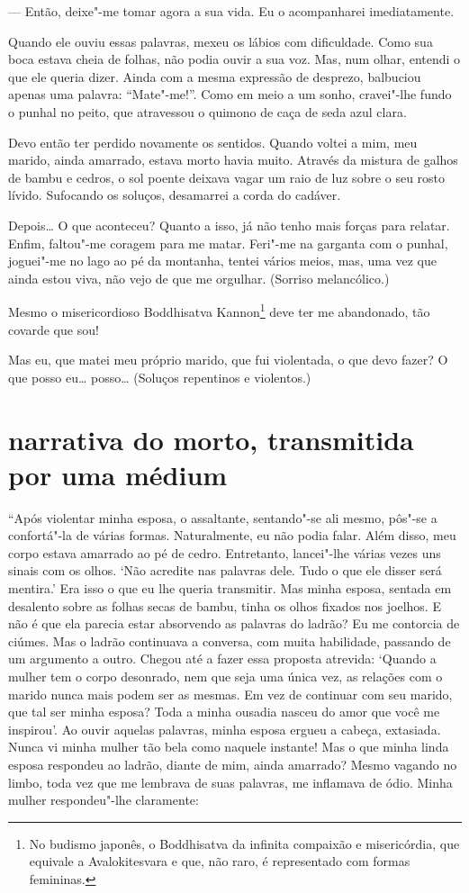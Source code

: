 --- Então, deixe"-me tomar agora a sua vida. Eu o acompanharei
imediatamente.

Quando ele ouviu essas palavras, mexeu os lábios com dificuldade. Como
sua boca estava cheia de folhas, não podia ouvir a sua voz. Mas, num
olhar, entendi o que ele queria dizer. Ainda com a mesma expressão de
desprezo, balbuciou apenas uma palavra: ``Mate"-me!''. Como em meio a um
sonho, cravei"-lhe fundo o punhal no peito, que atravessou o quimono de
caça de seda azul clara.

Devo então ter perdido novamente os sentidos. Quando voltei a mim, meu
marido, ainda amarrado, estava morto havia muito. Através da mistura de
galhos de bambu e cedros, o sol poente deixava vagar um raio de luz
sobre o seu rosto lívido. Sufocando os soluços, desamarrei a corda do cadáver.

Depois\ldots{} O que aconteceu? Quanto a isso, já não tenho mais forças para
relatar. Enfim, faltou"-me coragem para me matar. Feri"-me na garganta
com o punhal, joguei"-me no lago ao pé da montanha, tentei vários meios,
mas, uma vez que ainda estou viva, não vejo de que me orgulhar.
(Sorriso melancólico.)

Mesmo o misericordioso Boddhisatva Kannon\footnote{ No budismo japonês,
o Boddhisatva da infinita compaixão e misericórdia, que equivale a
Avalokitesvara e que, não raro, é representado com formas femininas.}
deve ter me abandonado, tão covarde que sou!

Mas eu, que matei meu próprio marido, que fui violentada, o que devo
fazer? O que posso eu\ldots{} posso\ldots{} (Soluços repentinos e violentos.)

\section*{narrativa do morto, transmitida por uma médium}

``Após violentar minha esposa, o assaltante, sentando"-se ali mesmo,
pôs"-se a confortá"-la de várias formas. Naturalmente, eu não podia
falar. Além disso, meu corpo estava amarrado ao pé de cedro.
Entretanto, lancei"-lhe várias vezes uns sinais com os olhos. `Não
acredite nas palavras dele. Tudo o que ele disser será mentira.' Era
isso o que eu lhe queria transmitir. Mas minha esposa, sentada em
desalento sobre as folhas secas de bambu, tinha os olhos fixados nos
joelhos. E não é que ela parecia estar absorvendo as palavras do
ladrão? Eu me contorcia de ciúmes. Mas o ladrão continuava a conversa,
com muita habilidade, passando de um argumento a outro. Chegou até a
fazer essa proposta atrevida: `Quando a mulher tem o corpo desonrado,
nem que seja uma única vez, as relações com o marido nunca mais podem
ser as mesmas. Em vez de continuar com seu marido, que tal ser minha
esposa? Toda a minha ousadia nasceu do amor que você me inspirou'. Ao
ouvir aquelas palavras, minha esposa ergueu a cabeça, extasiada. Nunca
vi minha mulher tão bela como naquele instante! Mas o que minha linda
esposa respondeu ao ladrão, diante de mim, ainda amarrado? Mesmo
vagando no limbo, toda vez que me lembrava de suas palavras, me
inflamava de ódio. Minha mulher respondeu"-lhe claramente:


